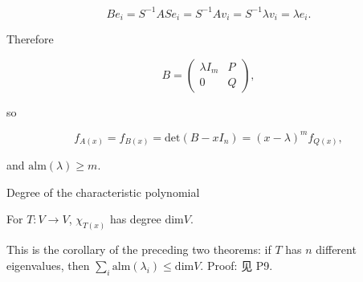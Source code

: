 \[Be_{i} = S^{- 1}ASe_{i} = S^{- 1}Av_{i} = S^{- 1}\lambda v_{i} = \lambda e_{i}.\]

Therefore

\[B = \begin{pmatrix}
{\lambda I_{m}} & P \\
0 & Q
\end{pmatrix},\]

so

\[f_{A{(x)}} = f_{B{(x)}} = \text{det}\left( {B - xI_{n}} \right) = \left( {x - \lambda} \right)^{m}f_{Q{(x)}},\]

and \(\text{alm}(\lambda) \geq m\).

\begin{theorem}{Degree of the characteristic polynomial}

For \(T:V\rightarrow V\), \(\chi_{T{(x)}}\) has degree \(\text{dim}V\).

\end{theorem}

This is the corollary of the preceding two theorems: if \(T\) has \(n\) different eigenvalues, then \(\sum_{i}\text{alm}\left( \lambda_{i} \right) \leq \text{dim}V\). Proof: 见 P9.
